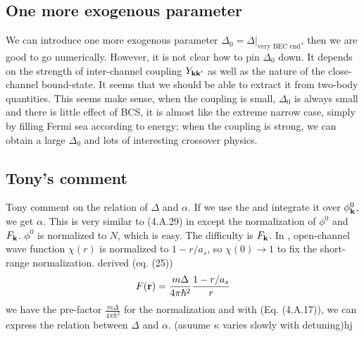 \subsection{One more exogenous parameter}
We can introduce one more exogenous parameter $\Delta_{0}=\Delta|_\text{very BEC end}$, then we are good to go numerically.  However, it is not clear how to pin $\Delta_{0}$ down.  It depends on the strength of inter-channel coupling $Y_{\mathbf{k}\mathbf{k}'}$ as well as the nature of the close-channel bound-state.  It seems that we should be able to extract it from two-body quantities.  This seems make sense, when the coupling is small, $\Delta_{0}$ is always small and there is little effect of BCS, it is almost like the extreme narrow case, simply by filling Fermi sea according to energy; when the coupling is strong, we can obtain a large $\Delta_{0}$ and lots of interesting crossover physics.  

\subsection{Tony's comment}
Tony comment on the relation of $\Delta$ and $\alpha$.  If we use the  and integrate it over $\phi^{0}_{\mathbf{k}}$, we get $\alpha$.  This is very similar to (4.A.29) in \cite{Leggett} except the normalization of $\phi^{0}$ and $F_{\mathbf{k}}$.  $\phi^{0}$ is normalized to $N$, which is easy.  The difficulty is $F_{\mathbf{k}}$.  In \cite{Leggett}, open-channel wave function $\chi(r)$ is normalized to $1-r/a_{s}$, so $\chi(0)\rightarrow1$ to fix the short-range normalization.  \cite{shizhongSumRule} derived  (eq. (25))
\begin{equation}\label{eq:20101025:fr}
F(\mathbf{r})=\frac{m\Delta}{4\pi\hbar^{2}}\frac{1-r/a_{s}}{r}
\end{equation}
we have the pre-factor $\frac{m\Delta}{4\pi\hbar^{2}}$ for the normalization and with \cite{Leggett} (Eq. (4.A.17)), we can express the relation between $\Delta$ and $\alpha$.  (asuume $\kappa$ varies slowly with detuning)hj